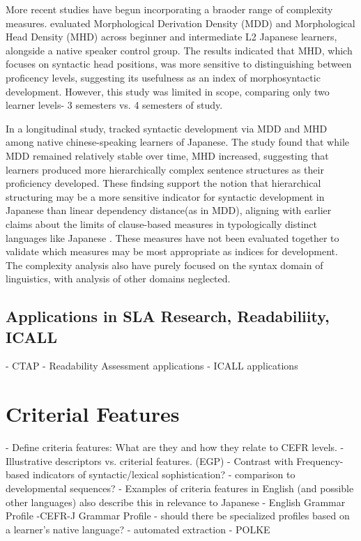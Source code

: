 More recent studies have begun incorporating a braoder range of complexity measures. \cite{komori2019} evaluated
Morphological Derivation Density (MDD) and Morphological Head Density (MHD) across beginner and intermediate L2
Japanese learners, alongside a native speaker control group. The results indicated that MHD, which focuses on
syntactic head positions, was more sensitive to distinguishing between proficency levels, suggesting its usefulness
as an index of morphosyntactic development. However, this study was limited in scope, comparing only two learner
levels- 3 semesters vs. 4 semesters of study.

In a longitudinal study, \cite{Yang2023} tracked syntactic development via MDD and MHD among native chinese-speaking
learners of Japanese. The study found that while MDD remained relatively stable over time, MHD increased, suggesting
that learners produced more hierarchically complex sentence structures as their proficiency developed. These
findsing support the notion that hierarchical structuring may be a more sensitive indicator for syntactic development
in Japanese than linear dependency distance(as in MDD), aligning with earlier claims about the limits of
clause-based measures in typologically distinct languages like Japanese \citep{Iwashita2006}. These measures have
not been evaluated together to validate which measures may be most appropriate as indices for development. The
complexity analysis also have purely focused on the syntax domain of linguistics, with
analysis of other domains neglected.

\subsection{Applications in SLA Research, Readabiliity, ICALL}
- CTAP
- Readability Assessment applications
- ICALL applications


\section{Criterial Features}
- Define criteria features: What are they and how they relate to CEFR levels.
- Illustrative descriptors vs. criterial features. (EGP)
- Contrast with Frequency-based indicators of syntactic/lexical sophistication? \cite{Ellis2004}
    - comparison to developmental sequences?
- Examples of criteria features in English (and possible other languages) also describe this in relevance to Japanese
    - English Grammar Profile
    -CEFR-J Grammar Profile
    - should there be specialized profiles based on a learner's native language?
- automated extraction - POLKE



